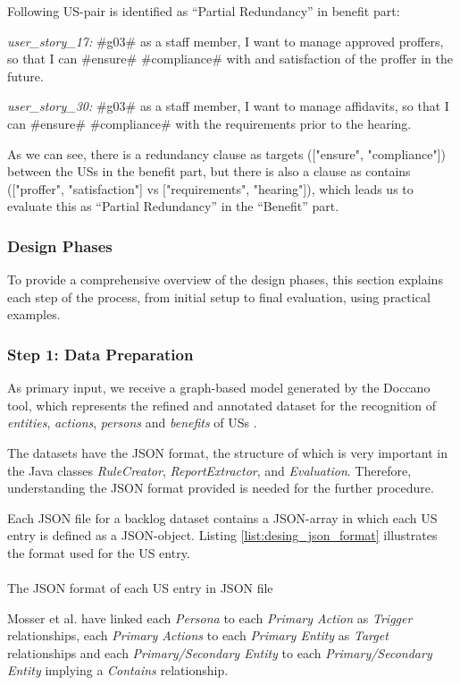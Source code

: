 \begin{example}
	Following US-pair is identified as \enquote{Partial Redundancy} in benefit part:
	
	\textit{user\_story\_17:} \#g03\# as a staff member, I want to manage approved proffers, so that I can \#ensure\# \#compliance\# with and satisfaction of the proffer in the future.
	
	\textit{user\_story\_30:} \#g03\# as a staff member, I want to manage affidavits, so that I can \#ensure\# \#compliance\# with the requirements prior to the hearing.
	
	As we can see, there is a redundancy clause as targets (["ensure", "compliance"]) between the USs in the benefit part, but there is also a clause as contains (["proffer", "satisfaction"] vs ["requirements", "hearing"]), which leads us to evaluate this as \enquote{Partial Redundancy} in the \enquote{Benefit} part.
\end{example}
\subsubsection*{Design Phases}\label{design_phases}
To provide a comprehensive overview of the design phases, this section explains each step of the process, from initial setup to final evaluation, using practical examples.
\subsubsection*{Step 1: Data Preparation}\label{design_step_1}
As primary input, we receive a graph-based model generated by the Doccano tool, which represents the refined and annotated dataset for the recognition of \emph{entities}, \emph{actions}, \emph{persons} and \emph{benefits} of USs \cite{arulmohan2023extracting}.

The datasets have the JSON format, the structure of which is very important in the Java classes \textit{RuleCreator}, \textit{ReportExtractor}, and \textit{Evaluation}. Therefore, understanding the JSON format provided is needed for the further procedure.

Each JSON file for a backlog dataset contains a JSON-array in which each US entry is defined as a JSON-object. Listing \ref{list:desing_json_format} illustrates the format used for the US entry.
\begin{MyListing}
	\paragraph{}
	
	\centering
	
	\caption{The JSON format of each US entry in JSON file}\label{list:desing_json_format}
	
\end{MyListing}
Mosser et al. have linked each \emph{Persona} to each \emph{Primary Action} as \emph{Trigger} relationships, each \emph{Primary Actions} to each \emph{Primary Entity} as \emph{Target} relationships and each \emph{Primary/Secondary Entity} to each \emph{Primary/Secondary Entity} implying a \emph{Contains} relationship\cite{arulmohan2023extracting}.

